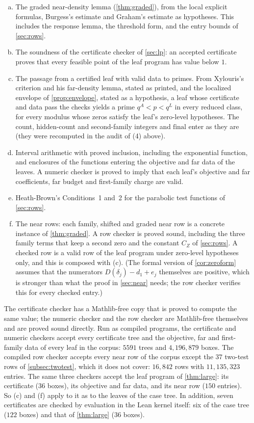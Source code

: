 \documentclass[11pt]{amsart}
\numberwithin{equation}{section}
\theoremstyle{plain}
\theoremstyle{definition}
\theoremstyle{remark}
\newcommand{\1}{\mathbf{1}}
\begin{document}
\begin{enumerate}[(a)]
  \item The graded near-density lemma (\cref{thm:graded}), from the local explicit formulas,
    Burgess's estimate and Graham's estimate as hypotheses. This includes the response lemma,
    the threshold form, and the entry bounds of \cref{sec:rows}.
  \item The soundness of the certificate checker of \cref{sec:lp}: an accepted certificate
    proves that every feasible point of the leaf program has value below $1$.
  \item The passage from a certified leaf with valid data to primes. From Xylouris's criterion
    and his far-density lemma, stated as printed, and the localized envelope of
    \cref{prop:envelope}, stated as a hypothesis, a leaf whose certificate and data pass the checks
    yields a prime $q^{A}<p<q^{L}$ in every reduced class, for every modulus whose zeros satisfy
    the leaf's zero-level hypotheses. The count, hidden-count and second-family integers and
    $\mathrm{final}$ enter as they are (they were recomputed in the audit of (4) above).
  \item Interval arithmetic with proved inclusion, including the exponential function, and
    enclosures of the functions entering the objective and far data of the leaves. A numeric
    checker is proved to imply that each leaf's objective and far coefficients, far budget and
    first-family charge are valid.
  \item Heath-Brown's Conditions~1 and~2 for the parabolic test functions of \cref{sec:rows}.
  \item The near rows: each family, shifted and graded near row is a concrete instance of
    \cref{thm:graded}. A row checker is proved sound, including the three family terms that keep a second zero and the constant
    $C_Z$ of \cref{sec:rows}. A checked row is a valid row of the leaf program under
    zero-level hypotheses only, and this is composed with (c). (The formal version of
    \cref{cor:zeroform} assumes that the numerators $D(\delta_j)-d_1+e_j$ themselves are positive,
    which is stronger than what the proof in \cref{sec:near} needs; the row checker verifies this
    for every checked entry.)
\end{enumerate}
The certificate checker has a Mathlib-free copy that is proved to compute the same value; the
numeric checker and the row checker are Mathlib-free themselves and are proved sound directly.
Run as compiled programs, the certificate and numeric checkers accept every certificate tree and
the objective, far and first-family data of every leaf in the corpus: $5591$ trees and
$4{,}196{,}879$ boxes.
The compiled row checker accepts every near row of the corpus except the $37$ two-test rows of
\cref{subsec:twotest}, which it does not cover: $16{,}842$ rows with $11{,}135{,}323$ entries. The same
three checkers accept the leaf program of \cref{thm:large}: its certificate ($36$ boxes), its
objective and far data, and its near row ($150$ entries). So (c) and (f) apply to it as to the leaves of the
case tree. In addition, seven certificates are checked by evaluation in the Lean kernel itself:
six of the case tree ($122$ boxes) and that of \cref{thm:large} ($36$ boxes).
\end{document}
